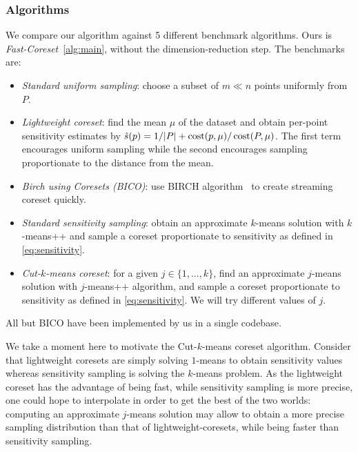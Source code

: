 

\subsubsection{Algorithms}
We compare our algorithm against 5 different benchmark algorithms. Ours is \emph{Fast-Coreset}~\ref{alg:main}, without the dimension-reduction step. The benchmarks are:
\begin{itemize}
        \item \emph{Standard uniform sampling}: choose a subset of $m \ll n$ points uniformly from $P$.
        \item \emph{Lightweight coreset}: find the mean $\mu$ of the dataset and obtain per-point sensitivity estimates by $\hat{s}(p) = 1/|P| + \operatorname{cost}(p, \mu) / \operatorname{cost}(P, \mu)$.
            The first term encourages uniform sampling while the second encourages sampling proportionate to the distance from the mean.
        \item \emph{Birch using Coresets (BICO)}: use BIRCH algorithm~\cite{birch} to create streaming coreset quickly. 
        \item \emph{Standard sensitivity sampling}: obtain an approximate $k$-means solution with $k$-means++ and sample a coreset proportionate to sensitivity as defined in \cref{eq:sensitivity}.
        \item \emph{Cut-$k$-means coreset}: for a given $j \in \{1,..., k\}$, find an approximate $j$-means solution with $j$-means++ algorithm, and sample a coreset proportionate to sensitivity as defined in \cref{eq:sensitivity}. We will try different values of $j$. 
\end{itemize}
All but BICO have been implemented by us in a single codebase.

We take a moment here to motivate the Cut-$k$-means coreset algorithm.  Consider that lightweight coresets are simply solving $1$-means to obtain sensitivity
values whereas sensitivity sampling is solving the $k$-means problem.  As the lightweight coreset has the advantage of being fast, while sensitivity sampling is
more precise, one could hope to interpolate in order to get the best of the two worlds: computing an approximate $j$-means solution may allow to obtain a more
precise sampling distribution than that of lightweight-coresets, while being faster than sensitivity sampling.

